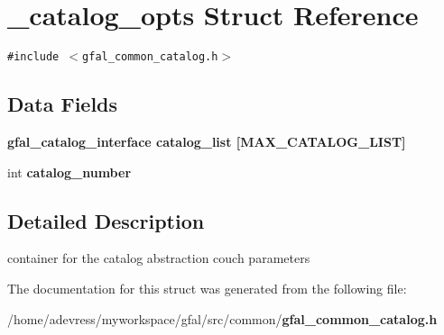 \section{\_\-catalog\_\-opts Struct Reference}
\label{struct__catalog__opts}
{\tt \#include $<$gfal\_\-common\_\-catalog.h$>$}

\subsection*{Data Fields}
\begin{CompactItemize}
\item 
\bf{gfal\_\-catalog\_\-interface} \textbf{catalog\_\-list} [MAX\_\-CATALOG\_\-LIST]\label{struct__catalog__opts_697c5a1807ecc48b1a7605785627e8b2}

\item 
int \textbf{catalog\_\-number}\label{struct__catalog__opts_526de1a9121c7c0b31f0c3b8967c5e38}

\end{CompactItemize}


\subsection{Detailed Description}
container for the catalog abstraction couch parameters 



The documentation for this struct was generated from the following file:\begin{CompactItemize}
\item 
/home/adevress/myworkspace/gfal/src/common/\bf{gfal\_\-common\_\-catalog.h}\end{CompactItemize}
